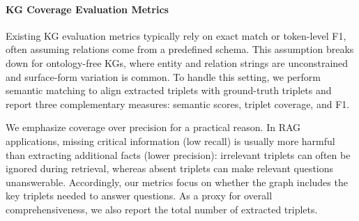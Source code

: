 \documentclass{article} %
\begin{document}

\paragraph{KG Coverage Evaluation Metrics}
Existing KG evaluation metrics typically rely on exact match or token-level F1, often assuming relations come from a predefined schema. This assumption breaks down for ontology-free KGs, where entity and relation strings are unconstrained and surface-form variation is common. To handle this setting, we perform semantic matching to align extracted triplets with ground-truth triplets and report three complementary measures: semantic scores, triplet coverage, and F1.

We emphasize coverage over precision for a practical reason. In RAG applications, missing critical information (low recall) is usually more harmful than extracting additional facts (lower precision): irrelevant triplets can often be ignored during retrieval, whereas absent triplets can make relevant questions unanswerable. Accordingly, our metrics focus on whether the graph includes the key triplets needed to answer questions. As a proxy for overall comprehensiveness, we also report the total number of extracted triplets.
\end{document}
